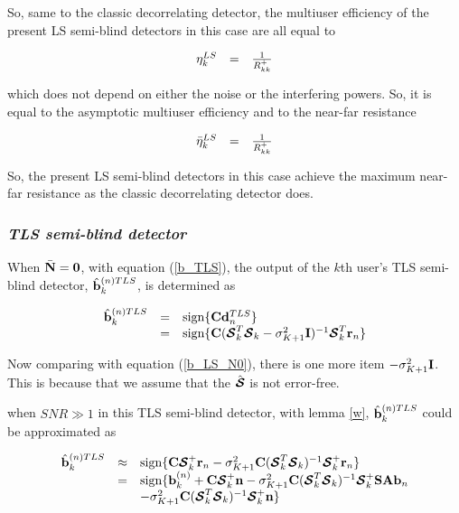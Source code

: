 \documentclass[a4paper,11pt,fleqn]{article}
\newcommand{\br}{{\mathbf r}}
\newcommand{\bA}{{\mathbf A}}
\newcommand{\bb}{{\bf b}}
\newcommand{\bC}{{\bf C}}
\newcommand{\bd}{{\bf d}}
\newcommand{\bn}{{\bf n}}
\newcommand{\bN}{{\bf N}}
\newcommand{\bS}{{\bf S}}
\newcommand{\bI}{{\bf I}}
\newcommand{\bcS}{{\mbox {\boldmath ${\cal S}$}}}
\begin{document}
So, same to the classic decorrelating detector, the multiuser
efficiency of the present LS semi-blind detectors in this case are
all equal to

\begin{equation}
\begin{array}{rcl}
\eta_k^{LS} &=& {1 \over R_{kk}^+}
\end{array}
\end{equation}

\noindent which does not depend on either the noise or the
interfering powers. So, it is equal to the asymptotic multiuser
efficiency and to the near-far resistance

\begin{equation}
\begin{array}{rcl}
\bar{\eta}_k^{LS} &=& {1 \over R_{kk}^+}
\end{array}
\end{equation}

So, the present LS semi-blind detectors in this case achieve the
maximum near-far resistance as the classic decorrelating detector
does.

\subsubsection*{\em TLS semi-blind detector \em}

When $\bar{\bN}=\mathbf{0}$, with equation (\ref{b_TLS}), the
output of the $k$th user's TLS semi-blind detector,
$\hat{\bb}_k^{(n) TLS}$, is determined as

\begin{equation}
\begin{array}{rcl}
\hat{\bb}_k^{(n)TLS }&=&\mbox{sign}\{\bC\bd_n^{TLS}\}\\
 &=&\mbox{sign}\{\bC(\bcS_k^T\bcS_k-\sigma_{K+1}^2\bI)^{-1}\bcS_k^T\br_n\}
\end{array}
\end{equation}


Now comparing with equation (\ref{b_LS_N0}), there is one more
item $-\sigma_{K+1}^2\bI$. This is because that we assume that the
$\hat{\bcS}$ is not error-free.

when $SNR\gg 1$ in this TLS semi-blind detector, with lemma
\ref{w}, $\hat{\bb}_k^{(n)TLS }$ could be approximated as

\begin{equation}
\begin{array}{rcl}
\hat{\bb}_k^{(n)TLS
}&\approx&\mbox{sign}\{\bC\bcS_k^{+}\br_n-\sigma_{K+1}^2\bC(\bcS_k^T\bcS_k)^{-1}\bcS_k^+\br_n\}\\
&=&\mbox{sign}\{\bb_k^{(n)}+\bC\bcS_k^+\bn-\sigma_{K+1}^2\bC(\bcS_k^T\bcS_k)^{-1}\bcS_k^{+}\bS\bA\bb_n\\
&&-\sigma_{K+1}^2\bC(\bcS_k^T\bcS_k)^{-1}\bcS_k^+\bn\}
\end{array}
\end{equation}
\end{document}
